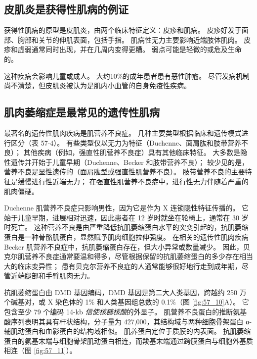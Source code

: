 \subsection{皮肌炎是获得性肌病的例证}

获得性肌病的原型是皮肌炎，由两个临床特征定义：皮疹和肌病。
皮疹好发于面部、胸部和关节的伸肌表面，包括手指。
肌病性无力主要影响近端肢体肌肉。
皮疹和虚弱通常同时出现，并在几周内变得更糟。
弱点可能是轻微的或危及生命的。


这种疾病会影响儿童或成人。
大约10\%的成年患者患有恶性肿瘤。
尽管发病机制尚不清楚，但皮肌炎被认为是肌内小血管的自身免疫性疾病。



\subsection{肌肉萎缩症是最常见的遗传性肌病}

最著名的遗传性肌肉疾病是肌营养不良症。
几种主要类型根据临床和遗传模式进行区分（表 57-4）。
有些类型仅以无力为特征（Duchenne、面肩肱和肢带营养不良）；
其他疾病（例如，强直性肌营养不良症）具有其他临床特征。 大多数是隐性遗传并开始于儿童早期（Duchenne、Becker 和肢带营养不良）；
较少见的是，营养不良是显性遗传的（面肩肱型或强直性肌营养不良）。
肢带营养不良的主要特征是缓慢进行性近端无力；
在强直性肌营养不良症中，进行性无力伴随着严重的肌肉僵硬。


Duchenne 肌营养不良症只影响男性，因为它是作为 X 连锁隐性特征传播的。
它始于儿童早期，进展相对迅速，因此患者在 12 岁时就坐在轮椅上，通常在 30 岁时死亡。
这种营养不良是由严重降低抗肌萎缩蛋白水平的突变引起的，抗肌萎缩蛋白是一种骨骼肌蛋白，显然赋予肌肉细胞拉伸强度。
在相关的遗传性肌肉疾病 Becker 肌营养不良症中，抗肌萎缩蛋白存在，但大小异常或数量减少。
因此，贝克尔肌营养不良症通常要温和得多，尽管根据保留的抗肌萎缩蛋白的多少存在相当大的临床变异性；
患有贝克尔营养不良症的人通常能够很好地行走到成年期，尽管近端腿部和手臂肌肉无力。


抗肌萎缩蛋白由 DMD 基因编码，DMD 基因是第二大人类基因，跨越约 250 万个碱基对，或 X 染色体的 1\% 和人类基因组总数的 0.1\%（图 \ref{fig:57_10}A）。
它包含至少 79 个编码 14-kb \textit{信使核糖核酸}的外显子。
肌营养不良蛋白的推断氨基酸序列表明其具有杆状结构，分子量为 427,000，其结构域与两种细胞骨架蛋白 α-辅肌动蛋白和血影蛋白的结构域相似。
肌养蛋白定位于质膜的内表面。
抗肌萎缩蛋白的氨基末端与细胞骨架肌动蛋白相连，而羧基末端通过跨膜蛋白与细胞外基质相连（图 \ref{fig:57_11}）。


